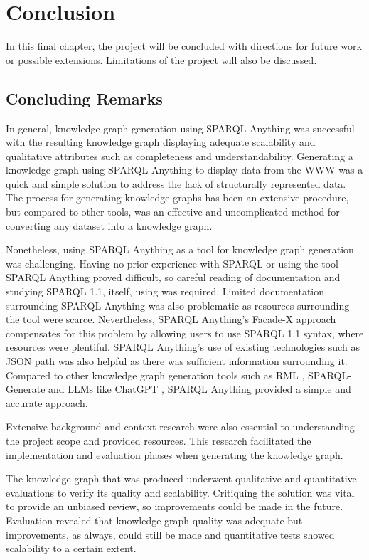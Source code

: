 \chapter{Conclusion}
In this final chapter, the project will be concluded with directions for future work or possible extensions. Limitations of the project will also be discussed. 

\section{Concluding Remarks}
\hspace{0.5cm} In general, knowledge graph generation using SPARQL Anything was successful with the resulting knowledge graph displaying adequate scalability and qualitative attributes such as completeness and understandability. Generating a knowledge graph using SPARQL Anything to display data from the WWW was a quick and simple solution to address the lack of structurally represented data. The process for generating knowledge graphs has been an extensive procedure, but compared to other tools, was an effective and uncomplicated method for converting any dataset into a knowledge graph. 

Nonetheless, using SPARQL Anything as a tool for knowledge graph generation was challenging. Having no prior experience with SPARQL or using the tool SPARQL Anything proved difficult, so careful reading of documentation \cite{sparqlanythinggithub} and studying SPARQL 1.1, itself, using \cite{sparlbook} was required. Limited documentation surrounding SPARQL Anything was also problematic as resources surrounding the tool were scarce. Nevertheless, SPARQL Anything's Facade-X approach compensates for this problem by allowing users to use SPARQL 1.1 syntax, where resources were plentiful. SPARQL Anything's use of existing technologies such as JSON path was also helpful as there was sufficient information surrounding it. Compared to other knowledge graph generation tools such as RML \cite{rml}, SPARQL-Generate \cite{sparqlgenerate} and LLMs like ChatGPT \cite{chatgptwebsite}, SPARQL Anything provided a simple and accurate approach. 

Extensive background and context research were also essential to understanding the project scope and provided resources. This research facilitated the implementation and evaluation phases when generating the knowledge graph. 

The knowledge graph that was produced underwent qualitative and quantitative evaluations to verify its quality and scalability. Critiquing the solution was vital to provide an unbiased review, so improvements could be made in the future. Evaluation revealed that knowledge graph quality was adequate but improvements, as always, could still be made and quantitative tests showed scalability to a certain extent. 

